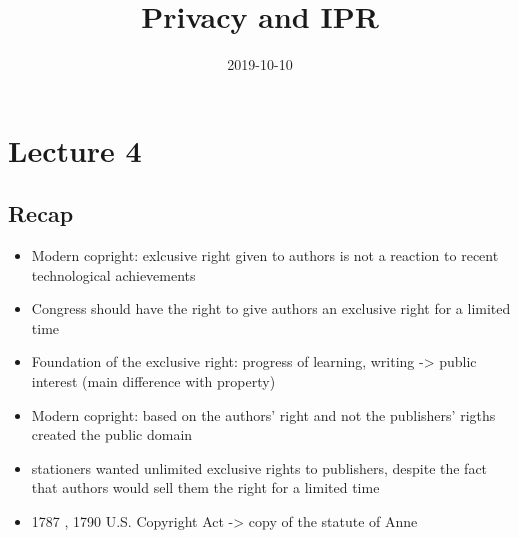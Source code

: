\documentclass{article}
\title{Privacy and IPR}
\date{2019-10-10}
\begin{document}
   \maketitle
   \newpage

\section{Lecture 4}

\subsection{Recap}
\begin{itemize}
\item Modern copright: exlcusive right given to authors is not a reaction to recent technological achievements
\item Congress should have the right to give authors an exclusive right for a limited time 
\item Foundation of the exclusive right: progress of  learning, writing -> public interest  (main difference with property)
\item Modern copright: based on the authors' right and not the publishers' rigths created the public domain
\item stationers wanted unlimited exclusive rights to publishers, despite the fact that authors would sell them the right for a limited time 
\item 1787 , 1790 U.S. Copyright Act -> copy of the statute of Anne
\end{itemize}
\end{document}
